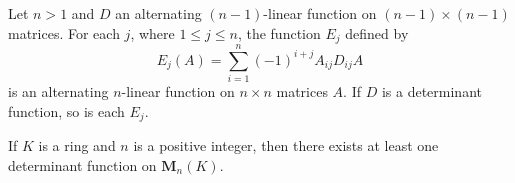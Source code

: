 \begin{theorem}
	Let $n>1$ and $D$ an alternating $(n-1)$-linear function on $(n-1) \times (n-1)$ matrices. For each $j$, where $1 \leq j \leq n$, the function $E_j$ defined by
	\[
		E_j(A) = \sum_{i=1}^n (-1)^{i+j} A_{ij} D_{ij} A
	\]
	is an alternating $n$-linear function on $n \times n$ matrices $A$. If $D$ is a determinant function, so is each $E_j$.
\end{theorem}

\begin{corollary}
	If $K$ is a ring and $n$ is a positive integer, then there exists at least one determinant function on $\textbf{M}_n(K)$.
\end{corollary}









